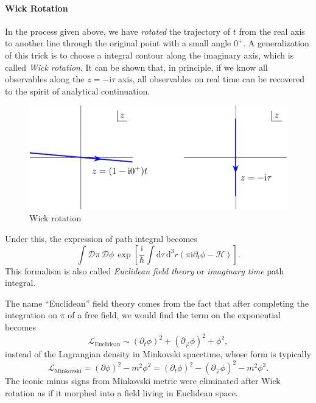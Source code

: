 \paragraph{Wick Rotation}
In the process given above, we have \emph{rotated} the trajectory of $t$ from the real axis to another line through the original point with a small angle $0^{+}$. A generalization of this trick is to choose a integral contour along the imaginary axis, which is called \emph{Wick rotation}. 
It can be shown that, in principle, if we know all observables along the $z = -\mathrm{i} \tau$ axis, all observables on real time can be recovered to the spirit of analytical continuation.
\begin{figure}[h]
  \centering
  \includegraphics{figures/wick_rotation.pdf}
  \caption{Wick rotation}
\end{figure}
Under this, the expression of path integral becomes 
\begin{equation}
  \int \mathcal{D} \pi \, \mathcal{D} \phi \, \exp \left[ \frac{\mathrm{i} }{\hbar} \int \mathrm{d} \tau \, \mathrm{d} ^{3} r \left( \pi \mathrm{i}  \partial_{t} \phi - \mathcal{H} \right)  \right] .
\end{equation}
This formalism is also called \emph{Euclidean field theory} or \emph{imaginary time} path integral.

The name ``Euclidean'' field theory comes from the fact that after completing the integration on $\pi$ of a free field, we would find the term on the exponential becomes
\begin{equation}
  \mathcal{L}_{\text{Euclidean}}\sim \left( \partial_{t} \phi \right) ^{2} + \left( \partial_{\vec{r}} \phi \right) ^{2} + \phi^{2},
\end{equation}
instead of the Lagrangian density in Minkovski spacetime, whose form is typically 
\begin{equation}
  \mathcal{L}_{\text{Minkovski}} = \left( \partial\phi \right) ^{2} - m^{2} \phi^{2} = \left( \partial_{t} \phi \right) ^{2} - \left( \partial_{\vec{r}} \phi \right) ^{2} - m^{2} \phi^{2}.
\end{equation}
The iconic minus signs from Minkovski metric were eliminated after Wick rotation as if it morphed into a field living in Euclidean space.


